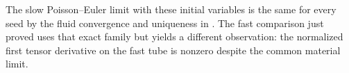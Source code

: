 The slow Poisson--Euler limit with these initial variables is the same for every seed by the fluid convergence and uniqueness in \cite[Thm.~1.1]{Oliynyk}. The fast comparison just proved uses that exact family but yields a different observation: the normalized first tensor derivative on the fast tube is nonzero despite the common material limit.

